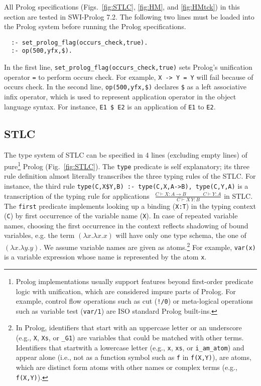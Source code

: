 \documentclass[runningheads,a4paper]{llncs}
\begin{document}
All Prolog specifications (Figs.~\ref{fig:STLC}, \ref{fig:HM},
and \ref{fig:HMtck}) in this section are tested in SWI-Prolog 7.2.
The following two lines must be loaded into the Prolog system
before running the Prolog specifications.
\begin{verbatim}
  :- set_prolog_flag(occurs_check,true).
  :- op(500,yfx,$).
\end{verbatim} \noindent
In the first line, \verb|set_prolog_flag(occurs_check,true)|
sets Prolog's unification operator \verb|=| to perform occurs check.
For example, \verb|X -> Y = Y| will fail because of occurs check.
In the second line, \verb|op(500,yfx,$)| declares \verb|$|
as a left associative infix operator, which is used to represent
application operator in the object language syntax. For instance,
\verb|E1 $ E2| is an application of \verb|E1| to
\verb|E2|.

\subsection{STLC}\label{ssec:STLC}
The type system of STLC can be specified in 4 lines
(excluding empty lines) of pure\footnote{
    Prolog implementations usually support features beyond
    first-order predicate logic with unification, which are
    considered impure parts of Prolog. For example,
    control flow operations such as cut (\texttt{!/0}) or
    meta-logical operations such as variable test (\texttt{var/1}) are
    ISO standard Prolog built-ins.} Prolog (Fig.~\ref{fig:STLC}).
The \verb|type| predicate is self explanatory; its three rule
definition almost literally transcribes the three typing rules of
the STLC. For instance, the third rule
\texttt{\small type(C,X\$Y,B) :- type(C,X,A->B), type(C,Y,A)}
is a transcription of the typing rule for applications
$~~\frac{C\vdash X:A\to B\qquad~~\quad C\vdash Y:A}{C\vdash X\,Y:B}$ in STLC.
The \verb|first| predicate implements looking up a binding
(\verb|X:T|) in the typing context (\verb|C|)
by first occurrence of the variable name (\verb|X|).
In case of repeated variable names, choosing the first occurrence in the context reflects shadowing of bound variables,
e.g. the term $(\lambda x. \lambda x. x)$ will have only one type schema, the one of $(\lambda x. \lambda y. y)$.
We assume variable names are given as atoms.\footnote{
    In Prolog, identifiers that start with an uppercase letter or
    an underscore (e.g., \texttt{X}, \texttt{Xs}, or \texttt{\_G1}) are
    variables that could be matched with other terms. Identifiers that
    startwith a lowercase letter (e.g., \texttt{x}, \texttt{xs}, or
    \texttt{i\_am\_atom}) and appear alone (i.e., not as a function symbol
    such as \texttt{f} in \texttt{f(X,Y)}), are atoms, which are
    distinct form atoms with other names or complex terms
    (e.g., \texttt{f(X,Y)}).} For example, \verb|var(x)| is
a variable expression whose name is represented by the atom \verb|x|.
\end{document}
